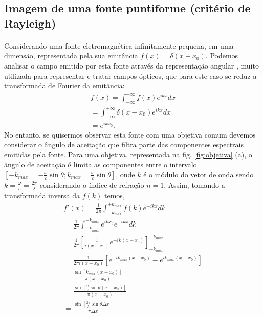 \subsection{Imagem de uma fonte puntiforme (critério de Rayleigh)}
\paragraph{}
Considerando uma fonte eletromagnética infinitamente pequena, em uma dimensão, representada pela sua emitância $f(x)=\delta(x-x_0)$. Podemos analisar o campo emitido por esta fonte através da representação angular \cite{principle}, muito utilizada para representar e tratar campos ópticos, que para este caso se reduz a transformada de Fourier da emitância:
\begin{eqnarray}
   f(x)=\int^{+\infty}_{-\infty}f(x)e^{ikx}dx \nonumber \\
	=\int^{+\infty}_{-\infty}\delta(x-x_0)e^{ikx}dx \nonumber \\
	=e^{ikx_0}.
\label{eqfonte}
\end{eqnarray}
No entanto, se quisermos observar esta fonte com uma objetiva comum devemos considerar o ângulo de aceitação que filtra parte das componentes espectrais emitidas pela fonte. Para uma objetiva, representada na fig. \ref{fig:objetiva} (a), o ângulo de aceitação $\theta$ limita as componentes entre o intervalo $[-k_{max}=-\frac{\omega}{c}\sin{\theta};k_{max}=\frac{\omega}{c}\sin{\theta}]$, onde $k$ é o módulo do vetor de onda sendo $k=\frac{\omega}{c}=\frac{2\pi}{\lambda}$ considerando o índice de refração $n=1$. Assim, tomando a transformada inversa da $f(k)$ temos,
\begin{eqnarray}
f'(x)=\frac{1}{2\pi}\int^{+k_{max}}_{-k_{max}}f(k)e^{-ikx}dk \nonumber \\
=\frac{1}{2\pi}\int^{+k_{max}}_{-k_{max}}e^{ikx_0}e^{-ikx}dk \nonumber \\
=\frac{1}{2\pi}\left[\frac{1}{i(x-x_0)}e^{-ik(x-x_0)}\right]^{+k_{max}}_{-k_{max}} \nonumber \\
=\frac{1}{2\pi i(x-x_0)}\left[e^{-ik_{max}(x-x_0)}-e^{ik_{max}(x-x_0)}\right] \nonumber \\
=\frac{\sin{\left[k_{max}(x-x_0)\right]}}{\pi(x-x_0)} \nonumber \\
=\frac{\sin{\left[\frac{\omega}{c}\sin{\theta}(x-x_0)\right]}}{\pi(x-x_0)} \nonumber \\
=\frac{\sin{\left[\frac{2\pi}{\lambda}\sin{\theta}\Delta x\right]}}{\pi\Delta x}
\label{sinc}
\end{eqnarray}

